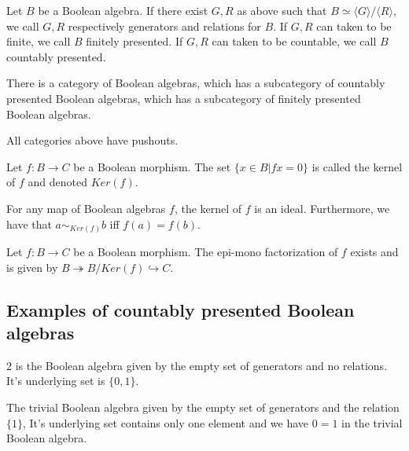 \documentclass{../util/zariski-small}
\begin{document}
\begin{definition}
  Let $B$ be a Boolean algebra. 
  If there exist $G, R$ as above such that 
  $B \simeq \langle G \rangle /\langle R \rangle$, 
  we call $G,R$ respectively generators and relations for $B$. 
  If $G,R$ can taken to be finite, we call $B$ finitely presented. 
  If $G,R$ can taken to be countable, we call $B$ countably presented. 
\end{definition}
\begin{remark}
  There is a category of Boolean algebras, which has a subcategory of countably presented Boolean algebras, 
  which has a subcategory of finitely presented Boolean algebras. 
\end{remark}
\begin{remark}\label{rmkBoolePushouts}
  All categories above have pushouts. 
\end{remark}
\begin{definition}
  Let $f:B\to C$ be a Boolean morphism. 
  The set $\{x \in B| fx = 0\}$ is called the kernel of $f$ and denoted 
  $Ker(f)$. 
\end{definition}
\begin{remark}
  For any map of Boolean algebras $f$, the kernel of $f$ is an ideal. 
  Furthermore, we have that $a\sim_{Ker(f)} b$ iff $f(a) = f(b)$. 
\end{remark}
\begin{remark}
  Let $f:B \to C$ be a Boolean morphism. 
  The epi-mono factorization of $f$ exists and is given by  
  $B \twoheadrightarrow B / Ker(f) \hookrightarrow C$.
\end{remark}

\subsection{Examples of countably presented Boolean algebras}
\begin{example}
  $2$ is the Boolean algebra given by the empty set of generators and no relations. 
    It's underlying set is $\{0,1\}$. 
\end{example}
\begin{example}
  The trivial Boolean algebra given by the empty set of generators and the relation $\{1\}$, 
  It's underlying set contains only one element and we have $0=1$ in the trivial Boolean algebra. 
\end{example}
\end{document}
